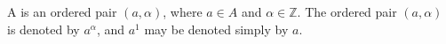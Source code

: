A  is an ordered pair $(a, \alpha)$, where $a \in A$ and $\alpha \in \mathbb{Z}$. The ordered pair $(a, \alpha)$ is denoted by $a^\alpha$, and $a^1$ may be denoted simply by $a$.
